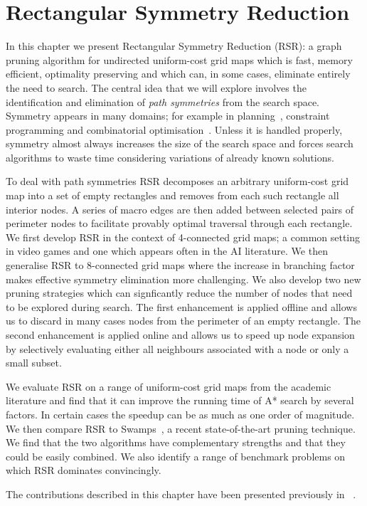 \chapter{Rectangular Symmetry Reduction}
\label{cha::rsr} 
In this chapter we present Rectangular Symmetry Reduction (RSR): a graph pruning
algorithm for undirected uniform-cost grid maps which is fast, memory efficient,
optimality preserving and which can, in some cases, eliminate entirely the need
to search.  The central idea that we will explore involves the identification
and elimination of \emph{path symmetries} from the search space. 
Symmetry appears in many domains; for example in planning~\citep{fox99}, constraint 
programming \citep{walsh07} and combinatorial optimisation~\citep{fukunaga08}. 
Unless it is handled properly, symmetry almost always 
increases the size of the search space and forces search algorithms to waste time
considering variations of already known solutions.
\par
To deal with path symmetries RSR decomposes an arbitrary uniform-cost grid map
into a set of empty rectangles and removes from each such
rectangle all interior nodes.  A
series of macro edges are then added between selected pairs of perimeter nodes
to facilitate provably optimal traversal through each rectangle.  
We first develop RSR in the context of 4-connected grid maps; a common
setting in video games and one which appears often in the AI literature.
We then generalise RSR to 8-connected grid maps where the increase in
branching factor makes effective symmetry elimination more challenging. 
We also develop two new pruning strategies which can signficantly
reduce the number of nodes that need to be explored during search. 
The first enhancement is applied offline and allows us to discard in many cases 
nodes from the perimeter of an empty rectangle. The second enhancement is
applied online and allows us to speed up node expansion by selectively
evaluating either all neighbours associated with a node or only a small subset.

We evaluate RSR on a range of uniform-cost grid maps from the academic literature and find
that it can improve the running time of A* search by several factors. In certain cases the
speedup can be as much as one order of magnitude. We then compare RSR to 
Swamps~\citep{pochter10}, a recent state-of-the-art
pruning technique. We find that the two algorithms have complementary strengths and that they
could be easily combined. We also identify a range of benchmark problems on which RSR 
dominates convincingly.  
\par

The contributions described in this chapter have been presented previously in
~\citep{harabor10,harabor11a,harabor11c}.

